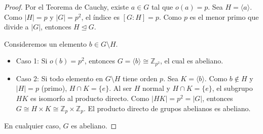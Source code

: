 \begin{proof}
    Por el Teorema de Cauchy, existe $a \in G$ tal que $o(a) = p$. Sea $H = \langle a \rangle$.
    Como $|H| = p$ y $|G| = p^2$, el índice es $[G : H] = p$. Como $p$ es el menor primo que divide a $|G|$, entonces $H \trianglelefteq G$.
    
    Consideremos un elemento $b \in G \setminus H$.
    \begin{itemize}
        \item Caso 1: Si $o(b) = p^2$, entonces $G = \langle b \rangle \cong \mathbb{Z}_{p^2}$, el cual es abeliano.
        \item Caso 2: Si todo elemento en $G \setminus H$ tiene orden $p$.
        Sea $K = \langle b \rangle$. Como $b \notin H$ y $|H|=p$ (primo), $H \cap K = \{e\}$.
        Al ser $H$ normal y $H \cap K = \{e\}$, el subgrupo $HK$ es isomorfo al producto directo.
        Como $|HK| = p^2 = |G|$, entonces $G \cong H \times K \cong \mathbb{Z}_p \times \mathbb{Z}_p$.
        El producto directo de grupos abelianos es abeliano.
    \end{itemize}
    En cualquier caso, $G$ es abeliano.
\end{proof}


